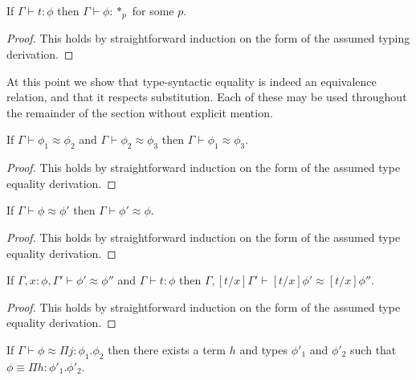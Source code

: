 \begin{lemma}[Regularity]
  If $\Gamma \vdash t:\phi$ then $\Gamma \vdash \phi:*_p$ for some $p$.
  \label{lemma:regularity_ssfe}
\end{lemma}
\begin{proof}
  This holds by straightforward induction on the form of the assumed
  typing derivation.
\end{proof}
\noindent
At this point we show that type-syntactic equality is indeed an
equivalence relation, and that it respects substitution.  Each of
these may be used throughout the remainder of the section without
explicit mention.
\begin{lemma}
  \label{lemma:transitivity_of_type_equality_ssfe}
  If $\Gamma \vdash \phi_1 \approx \phi_2$ and $\Gamma \vdash \phi_2 \approx \phi_3$ then
  $\Gamma \vdash \phi_1 \approx \phi_3$.
\end{lemma}
\begin{proof}
  This holds by straightforward induction on the form of the assumed
  type equality derivation.
\end{proof}
\begin{lemma}
  \label{lemma:symmetry_of_type_equality}
  If $\Gamma \vdash \phi \approx \phi'$ then $\Gamma \vdash \phi' \approx \phi$.
\end{lemma}
\begin{proof}
  This holds by straightforward induction on the form of the assumed
  type equality derivation.
\end{proof}
\begin{lemma}
  \label{lemma:substitution_for_type_equality_ssfe}
  If $\Gamma,x:\phi,\Gamma' \vdash \phi' \approx \phi''$ and $\Gamma \vdash t:\phi$ then
  $\Gamma,[t/x]\Gamma' \vdash [t/x]\phi' \approx [t/x]\phi''$.
\end{lemma}
\begin{proof}
  This holds by straightforward induction on the form of the assumed
  type equality derivation.
\end{proof}
\begin{lemma}[]
  \label{lemma:pis_are_equal_to_pis_ssfe}
  If $\Gamma \vdash \phi \approx \Pi j:\phi_1.\phi_2$ then there exists a term $h$ and types $\phi'_1$ and $\phi'_2$
  such that $\phi \equiv \Pi h:\phi'_1.\phi'_2$.
\end{lemma}
